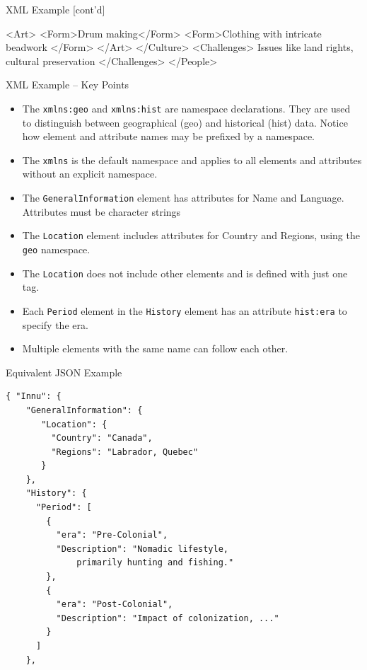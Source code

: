 \documentclass[ignorenonframetext,xcolor=x11names]{beamer}
\begin{document}
\begin{frame}[fragile]{XML Example \small [cont'd]}
\begin{xmlcode}
        <Art>
            <Form>Drum making</Form>
            <Form>Clothing with intricate beadwork
            </Form>
        </Art>
    </Culture>
    <Challenges>
        Issues like land rights, cultural preservation
    </Challenges>
</People>
\end{xmlcode}
\end{frame}

\begin{frame}{XML Example -- Key Points}
\small
\begin{itemize}
\item The \texttt{xmlns:geo} and \texttt{xmlns:hist} are namespace declarations. They are used to distinguish between geographical (geo) and historical (hist) data. Notice how element and attribute names may be prefixed by a namespace. 
\item The \texttt{xmlns} is the default namespace and applies to all elements and attributes without an explicit namespace.
\item The \texttt{GeneralInformation} element has attributes for Name and Language. Attributes must be character strings
\item The \texttt{Location} element includes attributes for Country and Regions, using the \texttt{geo} namespace.
\item The \texttt{Location} does not include other elements and is defined with just one tag.
\item Each \texttt{Period} element in the \texttt{History} element has an attribute \texttt{hist:era} to specify the era.
\item Multiple elements with the same name can follow each other.
\end{itemize}
\end{frame}

\begin{frame}[fragile]{Equivalent JSON Example}
\footnotesize
\begin{verbatim}
{ "Innu": {
    "GeneralInformation": {
       "Location": {
         "Country": "Canada",
         "Regions": "Labrador, Quebec"
       }
    },
    "History": {
      "Period": [
        {
          "era": "Pre-Colonial",
          "Description": "Nomadic lifestyle, 
              primarily hunting and fishing."
        },
        {
          "era": "Post-Colonial",
          "Description": "Impact of colonization, ..."
        }
      ]
    },
\end{verbatim}
\end{frame}
\end{document}
